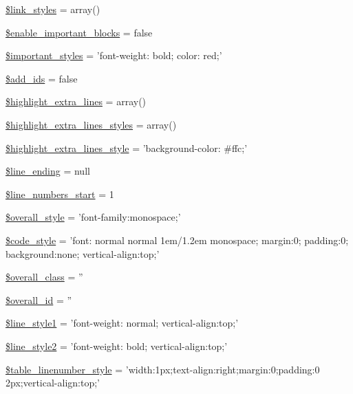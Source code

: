 \begin{DoxyCompactItemize}
\item 
\hyperlink{class_ge_s_hi_aec1e360701e87c41339671b3a87382d0}{\$link\-\_\-styles} = array()
\item 
\hyperlink{class_ge_s_hi_ac1a9230577ab22a7d88012daf8c9cb00}{\$enable\-\_\-important\-\_\-blocks} = false
\item 
\hyperlink{class_ge_s_hi_ad60ec93162108b80bf6cdd9decd74e4c}{\$important\-\_\-styles} = 'font-\/weight\-: bold; color\-: red;'
\item 
\hyperlink{class_ge_s_hi_a70ee7154455257ff993d299a2bd35d5d}{\$add\-\_\-ids} = false
\item 
\hyperlink{class_ge_s_hi_aaaa37ec87cc8ed80636d3a8e035fecae}{\$highlight\-\_\-extra\-\_\-lines} = array()
\item 
\hyperlink{class_ge_s_hi_affb373ad2d2448a84903566e4d189c4e}{\$highlight\-\_\-extra\-\_\-lines\-\_\-styles} = array()
\item 
\hyperlink{class_ge_s_hi_a94a7fe9bec0d689840e751abc6f738de}{\$highlight\-\_\-extra\-\_\-lines\-\_\-style} = 'background-\/color\-: \#ffc;'
\item 
\hyperlink{class_ge_s_hi_a736705b66eb05e8890b7b09479ee1b84}{\$line\-\_\-ending} = null
\item 
\hyperlink{class_ge_s_hi_a56b53d542d0bcd35655210f76a1fd924}{\$line\-\_\-numbers\-\_\-start} = 1
\item 
\hyperlink{class_ge_s_hi_ab22479e661609e9181548954e439ad95}{\$overall\-\_\-style} = 'font-\/family\-:monospace;'
\item 
\hyperlink{class_ge_s_hi_a8266c7d18371bd0c84f4459b307c87a0}{\$code\-\_\-style} = 'font\-: normal normal 1em/1.\-2em monospace; margin\-:0; padding\-:0; background\-:none; vertical-\/align\-:top;'
\item 
\hyperlink{class_ge_s_hi_abd3fa0e8c4497782aac51f1b05494bab}{\$overall\-\_\-class} = ''
\item 
\hyperlink{class_ge_s_hi_a48b5c8e8899088475f34a971e63e0b91}{\$overall\-\_\-id} = ''
\item 
\hyperlink{class_ge_s_hi_a149eb8b3e7520eb66c5286c73526e164}{\$line\-\_\-style1} = 'font-\/weight\-: normal; vertical-\/align\-:top;'
\item 
\hyperlink{class_ge_s_hi_a66a40a6cfd46f84c5575aea3cc15144d}{\$line\-\_\-style2} = 'font-\/weight\-: bold; vertical-\/align\-:top;'
\item 
\hyperlink{class_ge_s_hi_a334700e28e7643be6d7cb8f63e96d24f}{\$table\-\_\-linenumber\-\_\-style} = 'width\-:1px;text-\/align\-:right;margin\-:0;padding\-:0 2px;vertical-\/align\-:top;'

\end{DoxyCompactItemize}
